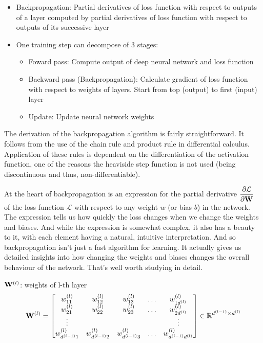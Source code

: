 \documentclass[14pt, a4paper]{article}
\numberwithin{equation}{section}
\numberwithin{algorithm}{section}
\numberwithin{figure}{section}
\begin{document}
\begin{itemize}
  \item Backpropagation: Partial derivatives of loss function with respect to outputs of a layer computed by partial derivatives of loss function with respect to outputs of its successive layer
    \item One training step can decompose of 3 stages:
  \begin{itemize}
    \item Foward pass: Compute output of deep neural network and loss function
       \item Backward pass (Backpropagation): Calculate gradient of loss function with respect to weights of layers. Start from top (output) to first (input) layer
        \item Update: Update neural network weights
  \end{itemize}
\end{itemize}

The derivation of the backpropagation algorithm is fairly straightforward. It follows from the use of the chain rule and product rule in differential calculus. 
Application of these rules is dependent on the differentiation of the activation function, one of the reasons the heaviside step function is not used (being discontinuous and thus, non-differentiable).

At the heart of backpropagation is an expression for the partial derivative $\dfrac{\partial \mathcal{L}}{\partial \bold{W}}$ of the loss function $\mathcal{L}$ with respect to any weight $w$ (or bias $b$) in the network. 
The expression tells us how quickly the loss changes when we change the weights and biases. 
And while the expression is somewhat complex, it also has a beauty to it, with each element having a natural, intuitive interpretation. 
And so backpropagation isn't just a fast algorithm for learning. It actually gives us detailed insights into how changing the weights and biases changes the overall behaviour of the network. 
That's well worth studying in detail.

$\bold{W}^{(l)}$: weights of l-th layer
\begin{equation*}
		\bold{W}^{(l)}=\begin{bmatrix} w_{11}^{(l)} & w_{12}^{(l)} & w_{13}^{(l)} & \dots & w_{1d^{(l)}}^{(l)} \\ w_{21}^{(l)} & w_{22}^{(l)} & w_{23}^{(l)} & \dots & w_{2d^{(l)}}^{(l)} \\ \vdots & \thickspace & \thickspace & \thickspace & \vdots \\ w_{d^{(l-1)}1}^{(l)} & w_{d^{(l-1)}2}^{(l)} & w_{d^{(l-1)}3}^{(l)} & \dots & w_{d^{(l-1)}d^{(l)}}^{(l)}\end{bmatrix} \in \mathbb{R}^{d^{(l-1)} \times d^{(l)}}
\end{equation*}
\end{document}
